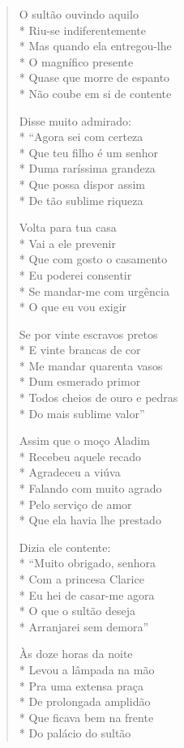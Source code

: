 \begin{verse}
O sultão ouvindo aquilo\\*
Riu-se indiferentemente\\*
Mas quando ela entregou-lhe\\*
O magnífico presente\\*
Quase que morre de espanto\\*
Não coube em si de contente

Disse muito admirado:\\*
``Agora sei com certeza\\*
Que teu filho é um senhor\\*
Duma raríssima grandeza\\*
Que possa dispor assim\\*
De tão sublime riqueza

Volta para tua casa\\*
Vai a ele prevenir\\*
Que com gosto o casamento\\*
Eu poderei consentir\\*
Se mandar-me com urgência\\*
O que eu vou exigir

Se por vinte escravos pretos\\*
E vinte brancas de cor\\*
Me mandar quarenta vasos\\*
Dum esmerado primor\\*
Todos cheios de ouro e pedras\\*
Do mais sublime valor''

Assim que o moço Aladim\\*
Recebeu aquele recado\\*
Agradeceu a viúva\\*
Falando com muito agrado\\*
Pelo serviço de amor\\*
Que ela havia lhe prestado

Dizia ele contente:\\*
``Muito obrigado, senhora\\*
Com a princesa Clarice\\*
Eu hei de casar-me agora\\*
O que o sultão deseja\\*
Arranjarei sem demora''

Às doze horas da noite\\*
Levou a lâmpada na mão\\*
Pra uma extensa praça\\*
De prolongada amplidão\\*
Que ficava bem na frente \\*
Do palácio do sultão


\end{verse}
